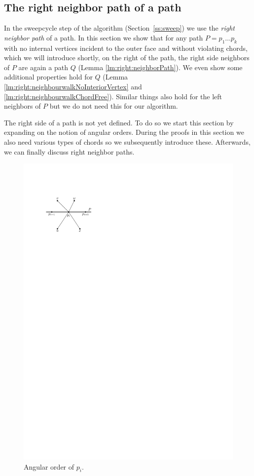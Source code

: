 
\subsection{The right neighbor path of a path}
\thispagestyle{plain}
  \label{ss:rightNeighbour}
  In the sweepcycle step of the algorithm (Section~\ref{ss:sweep}) we use the \emph{right neighbor path} of a path. In this section we show that for any path $P = p_1 \ldots p_k$ with no internal vertices incident to the outer face and without violating chords, which we will introduce shortly, on the right of the path, the right side neighbors of $P$ are again a path $Q$ (Lemma \ref{lm:right:neighborPath}).
  We even show some additional properties hold for $Q$ (Lemma  \ref{lm:right:neighbourwalkNoInteriorVertex} and \ref{lm:right:neighbourwalkChordFree}).
  Similar things also hold for the left neighbors of $P$ but we do not need this for our algorithm.

  The right side of a path is not yet defined. To do so we start this section by expanding on the notion of angular orders. During the proofs in this section we also need various types of chords so we subsequently introduce these. Afterwards, we can finally discuss right neighbor paths.


    \begin{figure}
      \centering
      \includegraphics[scale=1]{unifiedAlgo/img/rightNeighbourwalk/rotation}
      \caption{Angular order of $p_i$.}
      \label{fig:right:rot}
    \end{figure}

